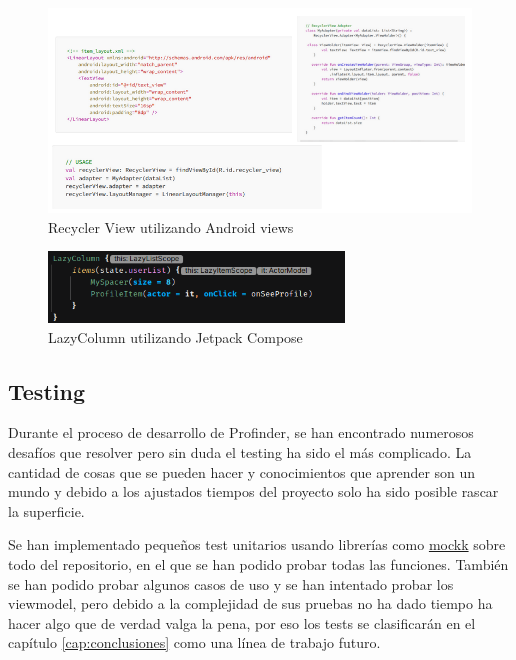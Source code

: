 \begin{figure}[h]
	\centering
	\includegraphics[width = 1\textwidth]{Imagenes/Fuentes/views_demo.png}
	\caption{Recycler View utilizando Android views \citep{RecyclerVsLazy}}
	\label{fig:views_demo}
\end{figure}
\newpage
\begin{figure}[h]
	\centering
	\includegraphics[width = 0.7\textwidth]{Imagenes/Fuentes/compose_demo.png}
	\caption{LazyColumn utilizando Jetpack Compose}
	\label{fig:compose_demo}
\end{figure}

\subsection{Testing}
\label{subsec:testing}
Durante el proceso de desarrollo de Profinder, se han encontrado numerosos desafíos que resolver pero sin duda el testing ha sido el más complicado. La cantidad de cosas que se pueden hacer y conocimientos que aprender son un mundo y debido a los ajustados tiempos del proyecto solo ha sido posible rascar la superficie.

Se han implementado pequeños test unitarios usando librerías como \href{https://mockk.io/ANDROID.html}{mockk} sobre todo del repositorio, en el que se han podido probar todas las funciones. También se han podido probar algunos casos de uso y se han intentado probar los viewmodel, pero debido a la complejidad de sus pruebas no ha dado tiempo ha hacer algo que de verdad valga la pena, por eso los tests se clasificarán en el capítulo \ref{cap:conclusiones} como una línea de trabajo futuro.

